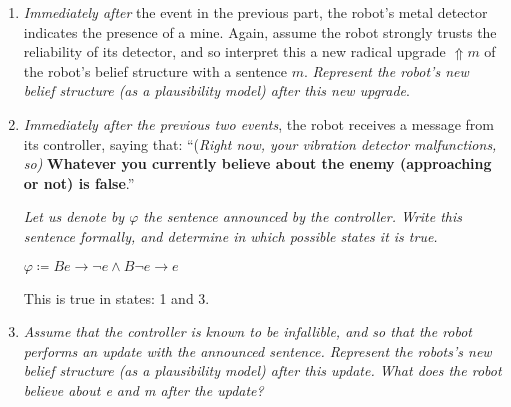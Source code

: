 \documentclass[leqno]{article}
\begin{document}
\begin{enumerate}
  \item \textit{Immediately after} the event in the previous part, the robot's 
  metal detector indicates the presence of a mine. 
  Again, assume the robot strongly trusts the reliability of its detector, and 
  so interpret this a new radical upgrade $\Uparrow m$ of the robot's belief 
  structure with a sentence $m$. 
  \textit{Represent the robot's new belief structure (as a plausibility model) 
  after this new upgrade}.

  \begin{center}
  \end{center}

  \item \textit{Immediately after the previous two events}, the robot receives 
  a message from its controller, saying that: ``(\textit{Right now, your 
  vibration detector malfunctions, so)} \textbf{Whatever you currently believe 
  about the enemy (approaching or not) is false}.''
  
  \textit{Let us denote by $\varphi$ the sentence announced by the controller. 
  Write this sentence formally, and determine in which possible states it is 
  true.}

  $\varphi \coloneqq Be \rightarrow \neg e \wedge B\neg e \rightarrow e$

  This is true in states: 1 and 3.

  \item \textit{Assume that the controller is known to be infallible, and so
  that the robot performs an update with the announced sentence. Represent the
  robots’s new belief structure (as a plausibility model) after this update.
  What does the robot believe about e and m after the update?}


\end{enumerate}
\end{document}
